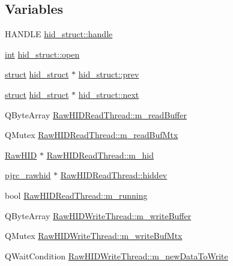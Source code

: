 \subsection*{Variables}
\begin{DoxyCompactItemize}
\item 
H\-A\-N\-D\-L\-E \hyperlink{group___raw_h_i_d_plugin_ga525aec9724c39727f65905e53be6a973}{hid\-\_\-struct\-::handle}
\item 
\hyperlink{ioapi_8h_a787fa3cf048117ba7123753c1e74fcd6}{int} \hyperlink{group___raw_h_i_d_plugin_gac3065ab2f0080eb3fe182cad3fff15ee}{hid\-\_\-struct\-::open}
\item 
\hyperlink{sdlgamepad_8dox_aba655c5729da86df745f0c8e7f9ba8d2}{struct} \hyperlink{structhid__struct}{hid\-\_\-struct} $\ast$ \hyperlink{group___raw_h_i_d_plugin_gac0d9fa3480e665ae9aca8a621a1dc66d}{hid\-\_\-struct\-::prev}
\item 
\hyperlink{sdlgamepad_8dox_aba655c5729da86df745f0c8e7f9ba8d2}{struct} \hyperlink{structhid__struct}{hid\-\_\-struct} $\ast$ \hyperlink{group___raw_h_i_d_plugin_gafe069ce715c9b005340052f4ea9f1a62}{hid\-\_\-struct\-::next}
\item 
Q\-Byte\-Array \hyperlink{group___raw_h_i_d_plugin_gaab5037bdcaa413fed7fea8c575861b1b}{Raw\-H\-I\-D\-Read\-Thread\-::m\-\_\-read\-Buffer}
\item 
Q\-Mutex \hyperlink{group___raw_h_i_d_plugin_ga5b3754efb963cd7171d34683320c01eb}{Raw\-H\-I\-D\-Read\-Thread\-::m\-\_\-read\-Buf\-Mtx}
\item 
\hyperlink{class_raw_h_i_d}{Raw\-H\-I\-D} $\ast$ \hyperlink{group___raw_h_i_d_plugin_gae4904e50399d18b7cce82e865d43dcbc}{Raw\-H\-I\-D\-Read\-Thread\-::m\-\_\-hid}
\item 
\hyperlink{classpjrc__rawhid}{pjrc\-\_\-rawhid} $\ast$ \hyperlink{group___raw_h_i_d_plugin_ga1a4a37b6308c6b835b62ea90dc2a37f9}{Raw\-H\-I\-D\-Read\-Thread\-::hiddev}
\item 
bool \hyperlink{group___raw_h_i_d_plugin_ga0b977a016ba6a452e9bdf1d49e2d89e3}{Raw\-H\-I\-D\-Read\-Thread\-::m\-\_\-running}
\item 
Q\-Byte\-Array \hyperlink{group___raw_h_i_d_plugin_ga4b0316d5c6599d45686fc5066a246e7e}{Raw\-H\-I\-D\-Write\-Thread\-::m\-\_\-write\-Buffer}
\item 
Q\-Mutex \hyperlink{group___raw_h_i_d_plugin_gaa53a045dd368b7ad82ac5853679019e0}{Raw\-H\-I\-D\-Write\-Thread\-::m\-\_\-write\-Buf\-Mtx}
\item 
Q\-Wait\-Condition \hyperlink{group___raw_h_i_d_plugin_ga1554ff98394a7da1f15042ff26061348}{Raw\-H\-I\-D\-Write\-Thread\-::m\-\_\-new\-Data\-To\-Write}

\end{DoxyCompactItemize}
